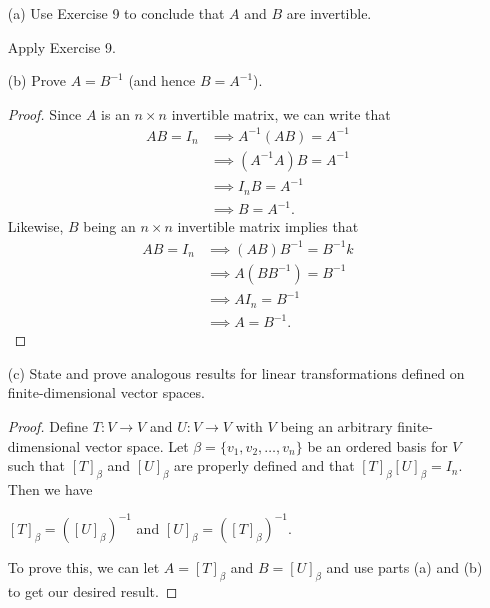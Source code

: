 \begin{enumerate}
    \item[(a)] Use Exercise 9 to conclude that \(  A  \) and \( B  \) are invertible.
        \begin{solution}
        Apply Exercise 9.
        \end{solution}
    \item[(b)] Prove \( A = B^{-1} \) (and hence \( B = A^{-1} \)).
        \begin{proof}
        Since \( A  \) is an \( n \times n  \) invertible matrix, we can write that
        \begin{align*}
            AB = {I}_{n} &\implies A^{-1}(AB) = A^{-1} \\
                         &\implies (A^{-1}A)B = A^{-1} \\
                         &\implies {I}_{n}B = A^{-1} \\
                         &\implies B = A^{-1}.
        \end{align*}
        Likewise, \( B  \) being an \(  n \times n  \) invertible matrix implies that
        \begin{align*}
            AB = {I}_{n} &\implies (AB)B^{-1} = B^{-1}k \\
                         &\implies A(B B^{-1}) = B^{-1} \\
                         &\implies A {I}_{n} = {B}^{-1} \\
                         &\implies A = B^{-1}.
        \end{align*}
        \end{proof}
    \item[(c)] State and prove analogous results for linear transformations defined on finite-dimensional vector spaces.
        \begin{proof}
        Define \( T: V \to V  \) and \( U: V \to V  \) with \( V  \) being an arbitrary finite-dimensional vector space. Let \( \beta = \{ {v}_{1}, {v}_{2}, \dots ,{v}_{n} \}   \) be an ordered basis for \( V  \) such that \( [T]_{\beta}  \) and \( [U]_{\beta} \) are properly defined and that \( [T]_{\beta} [U]_{\beta} = {I}_{n} \). Then we have
       \begin{center}
           \( [T]_{\beta} = ([U]_{\beta})^{-1} \) and \( [U]_{\beta} = ([T]_{\beta})^{-1} \).
       \end{center} 
       To prove this, we can let \( A = [T]_{\beta} \) and \( B = [U]_{\beta} \) and use parts (a) and (b) to get our desired result.
        \end{proof}
\end{enumerate}

